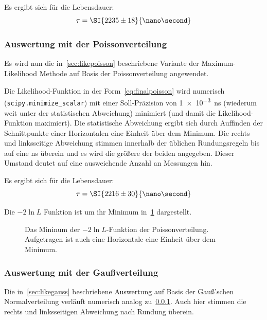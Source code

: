 \documentclass[slug=LM, room=Andreas-Schubert-Bau\,\ K\ 1A, supervisor=Anne-Sophie\ Berthold, coursedate=13.\ 12.\ 2019]{../../Lab_Report_LaTeX/lab_report}
\begin{document}
Es ergibt sich f\"ur die Lebensdauer:
\begin{equation}
  \label{eq:result-exponential}
  \tau = \SI{2235\pm 18}{\nano\second}
\end{equation}

\subsubsection{Auswertung mit der Poissonverteilung}
\label{sec:auw-poisson}

Es wird nun die in~\ref{sec:likepoisson} beschriebene Variante der
Maximum-Likelihood Methode auf Basis der Poissonverteilung angewendet.

Die Likelihood-Funktion in der Form~\ref{eq:finalpoisson} wird
numerisch (\verb|scipy.minimize_scalar|) mit einer Soll-Pr\"azision
von \SI{1e-3}{\nano\second} (wiederum weit unter der statistischen
Abweichung) minimiert (und damit die Likelihood-Funktion maximiert). Die
statistische Abweichung ergibt sich durch Auffinden der Schnittpunkte
einer Horizontalen eine Einheit \"uber dem Minimum. Die rechts und
linksseitige Abweichung stimmen innerhalb der \"ublichen
Rundungsregeln bis auf eine \si{\nano\second} \"uberein und es wird
die gr\"o\ss{}ere der beiden angegeben. Dieser Umstand deutet auf eine
ausweichende Anzahl an Messungen hin.

Es ergibt sich f\"ur die Lebensdauer:
\begin{equation}
  \label{eq:result-poisson}
  \tau = \SI{2216\pm 30}{\nano\second}
\end{equation}

Die \(-2\ln{L}\) Funktion ist um ihr Minimum
in~\ref{fig:haupt-poisson} dargestellt.

\begin{figure}[h]\centering
  
  \caption{Das Mininum der \(-2\ln{L}\)-Funktion der
    Poissonverteilung. Aufgetragen ist auch eine Horizontale eine
    Einheit \"uber dem Minimum.}
  \label{fig:haupt-poisson}
\end{figure}

\subsubsection{Auswertung mit der Gaußverteilung}
\label{sec:auw-gauss}

Die in~\ref{sec:likegauss} beschriebene Auswertung auf Basis der
Gauß'schen Normalverteilung verl\"auft numerisch analog
zu~\ref{sec:auw-poisson}. Auch hier stimmen die rechts und
linksseitigen Abweichung nach Rundung \"uberein.
\end{document}
